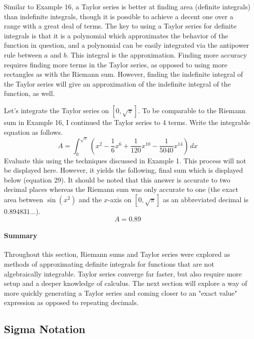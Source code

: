 \documentclass{article}
\begin{document}
Similar to Example 16, a Taylor series is better at finding area (definite integrals) than indefinite integrals, though it is possible to achieve a decent one over a range with a great deal of terms. The key to using a Taylor series for definite integrals is that it is a polynomial which approximates the behavior of the function in question, and a polynomial can be easily integrated via the antipower rule between $a$ and $b$. This integral is the approximation. Finding more accuracy requires finding more terms in the Taylor series, as opposed to using more rectangles as with the Riemann sum. However, finding the indefinite integral of the Taylor series will give an approximation of the indefinite integral of the function, as well.\par
Let's integrate the Taylor series on $\left[0,\sqrt{\pi}\right]$. To be comparable to the Riemann sum in Example 16, I continued the Taylor series to 4 terms. Write the integrable equation as follows.
\begin{equation*}
    A=\int_0^{\sqrt{\pi}} \left(x^2-\frac{1}{6}x^6+\frac{1}{120}x^{10}-\frac{1}{5040}x^{14}\right)\, dx
\end{equation*}
Evaluate this using the techniques discussed in Example 1. This process will not be displayed here. However, it yields the following, final sum which is displayed below (equation 29). It should be noted that this answer is accurate to two decimal places whereas the Riemann sum was only accurate to one (the exact area between $\sin(x^2)$ and the $x$-axis on $\left[0,\sqrt{\pi}\right]$ as an abbreviated decimal is $0.894831\ldots$).
\begin{equation}
    A=0.89
\end{equation}
\paragraph{Summary} Throughout this section, Riemann sums and Taylor series were explored as methods of approximating definite integrals for functions that are not algebraically integrable. Taylor series converge far faster, but also require more setup and a deeper knowledge of calculus. The next section will explore a way of more quickly generating a Taylor series and coming closer to an "exact value" expression as opposed to repeating decimals.
\newpage


\subsection{Sigma Notation}
\end{document}
